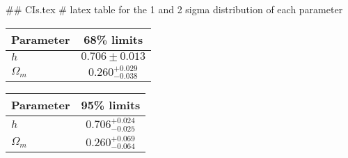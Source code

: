 ## CIs.tex
# latex table for the 1 and 2 sigma distribution of each parameter

\begin{tabular} { l  c}
 Parameter &  68\% limits\\
\hline
{\boldmath$h              $} & $0.706\pm 0.013            $\\
{\boldmath$\Omega_m       $} & $0.260^{+0.029}_{-0.038}   $\\
\hline
\end{tabular}

\begin{tabular} { l  c}
 Parameter &  95\% limits\\
\hline
{\boldmath$h              $} & $0.706^{+0.024}_{-0.025}   $\\
{\boldmath$\Omega_m       $} & $0.260^{+0.069}_{-0.064}   $\\
\hline
\end{tabular}
